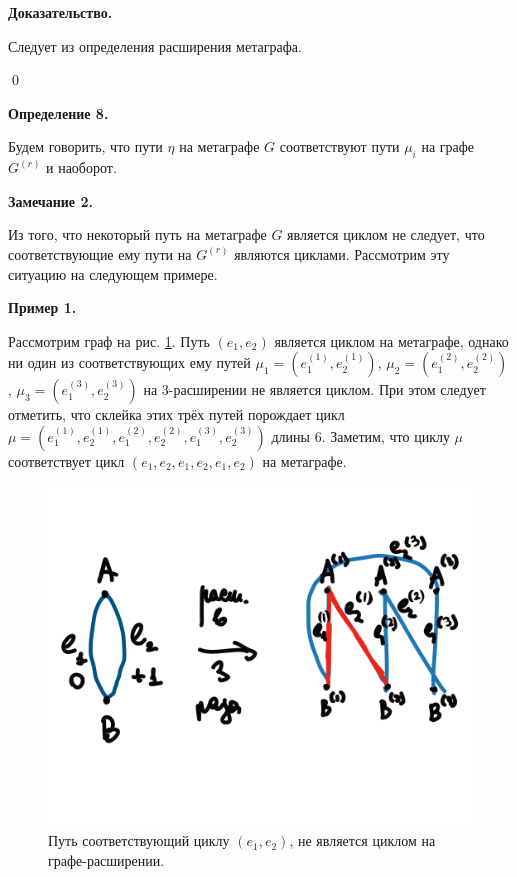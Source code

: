 \documentclass[14pt]{mmcs-article}
\begin{document}
\textbf{Доказательство.}


Следует из определения расширения метаграфа.

\qed

\textbf{Определение 8.}

Будем говорить, что пути $\eta$ на метаграфе $G$ соответствуют пути $\mu_i$ на графе $G^{(r)}$ и наоборот.

\textbf{Замечание 2.}

Из того, что некоторый путь на метаграфе $G$ является циклом не следует, что соответствующие ему пути на $G^{(r)}$ являются циклами. Рассмотрим эту ситуацию на следующем примере.

\textbf{Пример 1.}

Рассмотрим граф на рис. \ref{image:4}. Путь $(e_1, e_2)$ является циклом на метаграфе, однако ни один из соответствующих ему путей $\mu_1 = (e^{(1)}_1, e^{(1)}_2)$, $\mu_2 = (e^{(2)}_1, e^{(2)}_2)$, $\mu_3 = (e^{(3)}_1, e^{(3)}_2)$  на 3-расширении не является циклом. При этом следует отметить, что склейка этих трёх путей порождает цикл $\mu = (e^{(1)}_1, e^{(1)}_2, e^{(2)}_1, e^{(2)}_2, e^{(3)}_1, e^{(3)}_2)$ длины 6. Заметим, что циклу $\mu$ соответствует цикл $(e_1, e_2, e_1, e_2, e_1, e_2)$ на метаграфе.

\begin{figure}[H]
    \centering
    \includegraphics[scale=1.0]{cycle_on_metagraph_path_on_graph.png}
    \caption{ Путь соответствующий циклу $(e_1, e_2)$, не является циклом на графе-расширении. }\label{image:4}
\end{figure}
\end{document}
